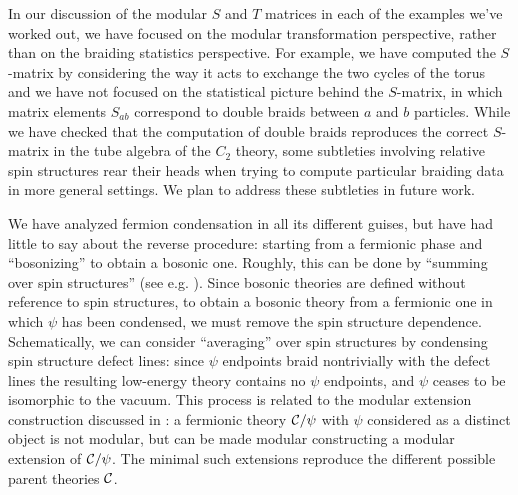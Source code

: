 In our discussion of the modular $S$ and $T$ matrices in each of the examples we've worked out, 
we have focused on the modular transformation perspective, rather than on the braiding statistics perspective. 
For example, we have computed the $S$-matrix by considering the way it acts to exchange the two 
cycles of the torus and 
we have not focused on the statistical picture behind the $S$-matrix, in which matrix elements $S_{ab}$ correspond to double braids between $a$ and $b$ particles. 
While we have checked that the computation of double braids reproduces the correct $S$-matrix 
in the tube algebra of the $C_2$ theory, some subtleties involving relative spin structures rear their heads when trying to compute particular braiding data in more general settings. 
We plan to address these subtleties in future work. 

We have analyzed fermion condensation in all its different guises, but have had little to say about the reverse procedure:
starting from a fermionic phase and ``bosonizing'' to obtain a bosonic one. Roughly, this can be done by 
``summing over spin structures'' (see e.g. \cite{bhardwaj2016,kapustin2017}).
Since bosonic theories are defined without reference to spin structures, to obtain a bosonic theory from a fermionic 
one in which $\psi$ has been condensed, we must remove the spin structure dependence. 
Schematically, we can consider ``averaging'' over spin structures by condensing spin structure defect lines: since $\psi$ endpoints braid nontrivially with the defect lines the resulting low-energy theory contains no 
$\psi$ endpoints, and $\psi$ ceases to be isomorphic to the vacuum. 
This process is related to the modular extension construction discussed in \cite{Lan2016b}: a fermionic theory $\mathcal{C} /\psi$ with $\psi$ considered as a distinct object is not modular, but can be made modular
constructing a modular extension of $\mathcal{C} / \psi$. The minimal such extensions reproduce the different possible 
parent theories $\mathcal{C}$. 

